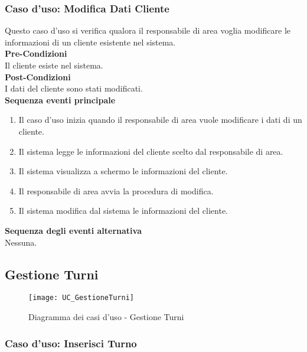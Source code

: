 \documentclass[green, fancy, 11pt]{elegantbook}
\begin{document}
\subsubsection{Caso d'uso: Modifica Dati Cliente}

Questo caso d’uso si verifica qualora il responsabile di area voglia modificare le informazioni di un cliente esistente nel sistema.\\
\textbf{Pre-Condizioni}\\
Il cliente esiste nel sistema.\\
\textbf{Post-Condizioni}\\
I dati del cliente sono stati modificati.\\
\textbf{Sequenza eventi principale}
\begin{enumerate}
	\item Il caso d’uso inizia quando il responsabile di area vuole modificare i dati di un cliente.
	\item Il sistema legge le informazioni del cliente scelto dal responsabile di area.
	\item Il sistema visualizza a schermo le informazioni del cliente.
	\item Il responsabile di area avvia la procedura di modifica.
	\item Il sistema modifica dal sistema le informazioni del cliente.
\end{enumerate}
\textbf{Sequenza degli eventi alternativa}\\
Nessuna.
\newpage

\subsection{Gestione Turni}
\begin{figure}[H]
	\centering
	\texttt{[image: UC\_GestioneTurni]}
	\caption{Diagramma dei casi d'uso - Gestione Turni}
\end{figure}

\subsubsection{Caso d'uso: Inserisci Turno}
\end{document}
